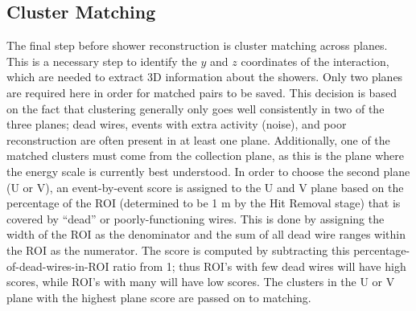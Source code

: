 
\subsection{Cluster Matching}
The final step before shower reconstruction is cluster matching across planes. This is a necessary step to identify the $y$ and $z$ coordinates of the interaction, which are needed to extract 3D information about the showers. Only two planes are required here in order for matched pairs to be saved. This decision is based on the fact that clustering generally only goes well consistently in two of the three planes; dead wires, events with extra activity (noise), and poor reconstruction are often present in at least one plane. Additionally, one of the matched clusters must come from the collection plane, as this is the plane where the energy scale is currently best understood.  In order to choose the second plane (U or V), an event-by-event score is assigned to the U and V plane based on the percentage of the ROI (determined to be 1 m by the Hit Removal stage) that is covered by ``dead'' or poorly-functioning wires.  
 This is done by assigning the width of the ROI as the denominator and the sum of all dead wire ranges within the ROI as the numerator. The score is computed by subtracting this percentage-of-dead-wires-in-ROI ratio from 1; thus ROI's with few dead wires will have high scores, while ROI's with many will have low scores.  The clusters in the U or V plane with the highest plane score are passed on to matching. 

